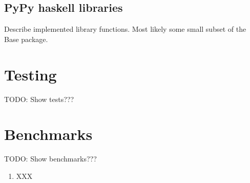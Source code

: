 \documentclass{article}
\begin{document}
\subsection{PyPy haskell libraries}

Describe implemented library functions. Most likely some small subset of the Base package.

\section{Testing}

TODO: Show tests???

\section{Benchmarks}

TODO: Show benchmarks???





\begin{enumerate}
\item XXX
\end{enumerate}






%
\end{document}
